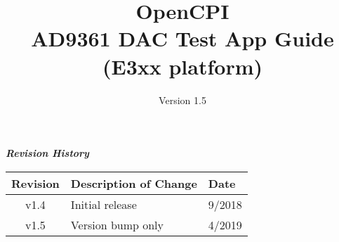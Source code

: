 \iffalse
This file is protected by Copyright. Please refer to the COPYRIGHT file
distributed with this source distribution.

This file is part of OpenCPI <http://www.opencpi.org>

OpenCPI is free software: you can redistribute it and/or modify it under the
terms of the GNU Lesser General Public License as published by the Free Software
Foundation, either version 3 of the License, or (at your option) any later
version.

OpenCPI is distributed in the hope that it will be useful, but WITHOUT ANY
WARRANTY; without even the implied warranty of MERCHANTABILITY or FITNESS FOR A
PARTICULAR PURPOSE. See the GNU Lesser General Public License for more details.

You should have received a copy of the GNU Lesser General Public License along
with this program. If not, see <http://www.gnu.org/licenses/>.
\fi

\def\docTitle{OpenCPI\\ AD9361 DAC Test App Guide (E3xx platform)}
\def\docVersion{1.5}

\date{Version \docVersion} %
\title{\docTitle}
\usepackage{graphicx}
\graphicspath{ {figures/} }
\usepackage{textcomp}
\usepackage{listings}


\maketitle
	\begin{center}
	\textit{\textbf{Revision History}}
		\begin{table}[H]
		\label{table:revisions} %
			\begin{tabularx}{\textwidth}{|c|X|l|}
			\hline
			\rowcolor{blue}
			\textbf{Revision} & \textbf{Description of Change} & \textbf{Date} \\
		    \hline
		    v1.4 & Initial release & 9/2018 \\
			\hline
		    v1.5 & Version bump only & 4/2019 \\
			\hline
			\end{tabularx}
		\end{table}
	\end{center}

